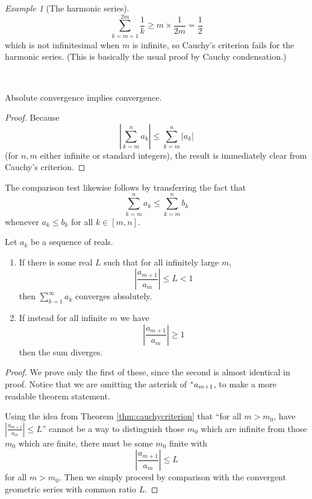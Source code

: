 \documentclass[11pt]{amsart}
\theoremstyle{remark}
\newtheorem*{example}{Example}
\newcommand{\hyp}[1][\mathbb{R}]{\prescript{*}{}{#1}}
\begin{document}
\begin{example}[The harmonic series]
$$\sum_{k=m+1}^{2m} \frac{1}{k} \geq m \times \frac{1}{2m} = \frac{1}{2}$$
which is not infinitesimal when $m$ is infinite, so Cauchy's criterion fails for the harmonic series.
(This is basically the usual proof by Cauchy condensation.)
\end{example}

\

\begin{thm}Absolute convergence implies convergence.
\end{thm}
\begin{proof}
Because $$\left | \sum_{k=m}^n a_k \right | \leq \sum_{k=m}^n |a_k|$$ (for $n, m$ either infinite or standard integers), the result is immediately clear from Cauchy's criterion.
\end{proof}

The comparison test likewise follows by transferring the fact that $$\sum_{k=m}^n a_k \leq \sum_{k=m}^n b_k$$ whenever $a_k \leq b_k$ for all $k \in [m, n]$.

\pagebreak

\begin{thm} Let $a_k$ be a sequence of reals.
\begin{enumerate}
\item If there is some real $L$ such that for all infinitely large $m$, $$\left | \frac{a_{m+1}}{a_m} \right | \leq L < 1$$ then $\sum_{k=1}^{\infty} a_k$ converges absolutely.
\item If instead for all infinite $m$ we have $$\left | \frac{a_{m+1}}{a_m} \right | \geq 1$$ then the sum diverges.
\end{enumerate}
\end{thm}
\begin{proof}
We prove only the first of these, since the second is almost identical in proof.
Notice that we are omitting the asterisk of $\hyp[a]_{m+1}$, to make a more readable theorem statement.

Using the idea from Theorem \ref{thm:cauchycriterion} that ``for all $m > m_0$, have $\left| \frac{a_{m+1}}{a_m} \right| \leq L$'' cannot be a way to distinguish those $m_0$ which are infinite from those $m_0$ which are finite, there must be some $m_0$ finite with $$\left| \frac{a_{m+1}}{a_m} \right| \leq L$$ for all $m > m_0$.
Then we simply proceed by comparison with the convergent geometric series with common ratio $L$.
\end{proof}
\end{document}
